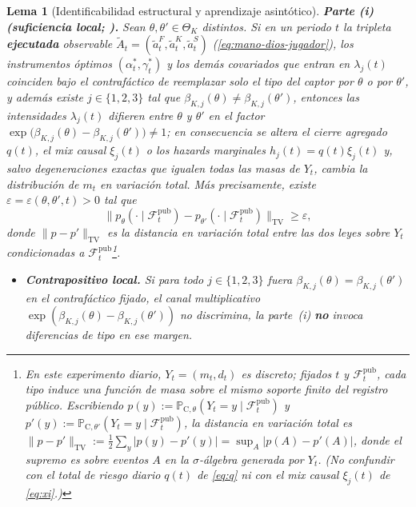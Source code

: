 \documentclass[12pt]{article}
\providecommand{\textcite}{\citet}
\newtheorem{lemma}[theorem]{Lema}
\theoremstyle{definition}
\theoremstyle{remark}
\newcommand{\ProbC}[1]{\mathbb{P}_{\mathrm{C},#1}}
\newcommand{\1}{\mathbf{1}}
\begin{document}
\begin{lemma}[Identificabilidad estructural y aprendizaje asintótico]
\medskip
\noindent\textbf{Parte \textup{(i)} \textup{(}suficiencia local; \textcite{Cox1972,Bradburn2003}\textup{)}.}
Sean $\theta,\theta'\in\Theta_K$ distintos. Si en un periodo $t$ la tripleta \textbf{ejecutada} observable $\tilde{A}_t=(\tilde{a}_t^F,\tilde{a}_t^K,\tilde{a}_t^S)$ \textup{(}\eqref{eq:mano-dios-jugador}\textup{)}, los instrumentos óptimos $(\alpha_t^\ast,\gamma_t^\ast)$ y los demás covariados que entran en $\lambda_j(t)$ coinciden bajo el contrafáctico de reemplazar solo el tipo del captor por $\theta$ o por $\theta'$, y además existe $j\in\{1,2,3\}$ tal que $\beta_{K,j}(\theta)\neq \beta_{K,j}(\theta')$, entonces las intensidades $\lambda_j(t)$ difieren entre $\theta$ y $\theta'$ en el factor $\exp\bigl(\beta_{K,j}(\theta)-\beta_{K,j}(\theta')\bigr)\neq 1$; en consecuencia se altera el cierre agregado $q(t)$, el mix causal $\xi_j(t)$ o los hazards marginales $h_j(t)=q(t)\xi_j(t)$ y, salvo degeneraciones exactas que igualen todas las masas de $Y_t$, cambia la distribución de $m_t$ en variación total. Más precisamente, existe $\varepsilon=\varepsilon(\theta,\theta',t)>0$ tal que
\begin{equation}
\label{eq:TV-separation}
\bigl\| p_\theta(\cdot\mid \mathcal{F}_t^{\mathrm{pub}})-p_{\theta'}(\cdot\mid \mathcal{F}_t^{\mathrm{pub}})\bigr\|_{\mathrm{TV}}\ge \varepsilon,
\end{equation}
donde $\|p-p'\|_{\mathrm{TV}}$ es la distancia en variación total entre las dos leyes sobre $Y_t$ condicionadas a $\mathcal{F}_t^{\mathrm{pub}}$\footnote{En este experimento diario, $Y_t=(m_t,d_t)$ es discreto; fijados $t$ y $\mathcal{F}_t^{\mathrm{pub}}$, cada tipo induce una función de masa sobre el mismo soporte finito del registro público. Escribiendo $p(y):=\ProbC{\theta}(Y_t=y\mid\mathcal{F}_t^{\mathrm{pub}})$ y $p'(y):=\ProbC{\theta'}(Y_t=y\mid\mathcal{F}_t^{\mathrm{pub}})$, la distancia en variación total es $\|p-p'\|_{\mathrm{TV}}:=\tfrac{1}{2}\sum_{y}\lvert p(y)-p'(y)\rvert=\sup_{A}\lvert p(A)-p'(A)\rvert$, donde el supremo es sobre eventos $A$ en la $\sigma$-álgebra generada por $Y_t$. \textup{(}No confundir con el total de riesgo diario $q(t)$ de \eqref{eq:q} ni con el mix causal $\xi_j(t)$ de \eqref{eq:xi}.\textup{)}}.
\begin{itemize}
  \setlength{\itemsep}{0.15em}%
  \setlength{\parsep}{0pt}%
  \item[\textup{(C1)}] \textbf{Contrapositivo local.} Si para todo $j\in\{1,2,3\}$ fuera $\beta_{K,j}(\theta)=\beta_{K,j}(\theta')$ en el contrafáctico fijado, el canal multiplicativo $\exp(\beta_{K,j}(\theta)-\beta_{K,j}(\theta'))$ no discrimina, la parte~\textup{(i)} \textbf{no} invoca diferencias de tipo en ese margen.

\end{itemize}
\end{lemma}
\end{document}
